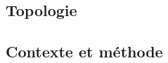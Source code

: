 \documentclass[12pt,a4paper]{article}
\begin{document}
\newpage
\begin{center}  
\section*{Topologie} 
\end{center}



\subsection*{Contexte et méthode}

\end{document}
